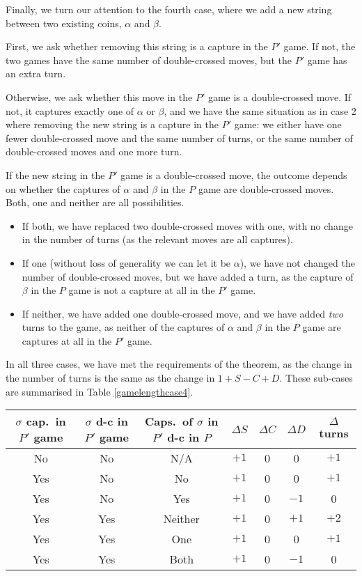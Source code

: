 \documentclass[a4paper,twocolumn]{article}
\begin{document}
Finally, we turn our attention to the fourth case, where we add a new
string between two existing coins, $\alpha$ and $\beta$.

First, we ask whether removing this string is a capture in the $P'$
game. If not, the two games have the same number of double-crossed
moves, but the $P'$ game has an extra turn.

Otherwise, we ask whether this move in the $P'$ game is a
double-crossed move. If not, it captures exactly one of $\alpha$ or
$\beta$, and we have the same situation as in case 2 where removing
the new string is a capture in the $P'$ game: we either have one fewer
double-crossed move and the same number of turns, or the same number
of double-crossed moves and one more turn.

If the new string in the $P'$ game is a double-crossed move, the
outcome depends on whether the captures of $\alpha$ and $\beta$ in the
$P$ game are double-crossed moves. Both, one and neither are all
possibilities.

\begin{itemize}
\item If both, we have replaced two double-crossed moves with one,
  with no change in the number of turns (as the relevant moves are all
  captures).
\item If one (without loss of generality we can let it be $\alpha$),
  we have not changed the number of double-crossed moves, but we have
  added a turn, as the capture of $\beta$ in the $P$ game is not a
  capture at all in the $P'$ game.
\item If neither, we have added one double-crossed move, and we have
  added \emph{two} turns to the game, as neither of the captures of
  $\alpha$ and $\beta$ in the $P$ game are captures at all in the $P'$
  game.
\end{itemize}

In all three cases, we have met the requirements of the theorem, as
the change in the number of turns is the same as the change in
$1+S-C+D$. These sub-cases are summarised in Table
\ref{gamelengthcase4}.

\begin{table*}[p]
  \centering
  \begin{tabular}{c c c c c c c}
    $\sigma$ cap.\ in $P'$ game & $\sigma$ d-c in $P'$ game &
    Caps.\ of $\sigma$ in $P'$ d-c in $P$ & $\Delta S$ & $\Delta
    C$ & $\Delta D$ & $\Delta$ turns \\
    \hline
    No & No & N/A & $+1$ & 0 & 0 & $+1$ \\
    Yes & No & No & $+1$ & 0 & 0 & $+1$ \\
    Yes & No & Yes & $+1$ & 0 & $-1$ & 0 \\
    Yes & Yes & Neither & $+1$ & 0 & $+1$ & $+2$ \\
    Yes & Yes & One & $+1$ & 0 & 0 & $+1$ \\
    Yes & Yes & Both & $+1$ & 0 & $-1$ & 0
  \end{tabular}
  \caption{New string $\sigma$ connecting existing coins $\alpha$
    and $\beta$}
  \label{gamelengthcase4}
\end{table*}
\end{document}
